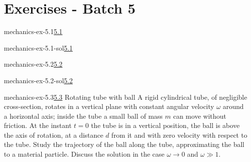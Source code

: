 \documentclass[preview]{standalone}
\begin{document}
\genpage

\section{Exercises - Batch 5}

\begin{snippetexercise}{mechanics-ex-5.1}{\underline{5.1}}
    \todo
\end{snippetexercise}

\begin{snippetsolution}{mechanics-ex-5.1-sol}{\underline{5.1}}
    \todo
\end{snippetsolution}

\begin{snippetexercise}{mechanics-ex-5.2}{\underline{5.2}}
    \todo
\end{snippetexercise}

\begin{snippetsolution}{mechanics-ex-5.2-sol}{\underline{5.2}}
    \todo
\end{snippetsolution}

\begin{snippetexercise}{mechanics-ex-5.3}{\underline{5.3} Rotating tube with ball}
    A rigid cylindrical tube, of negligible cross-section, rotates in a vertical plane with constant angular velocity
    \(\omega\) around a horizontal axis; inside the tube a small ball of mass \(m\) can move without friction.
    At the instant \(t=0\) the tube is in a vertical position, the ball is above the axis of rotation,
    at a distance \(d\) from it and with zero velocity with respect to the tube.
    Study the trajectory of the ball along the tube, approximating the ball to a material particle.
    Discuss the solution in the case
    \(\omega \to 0\) and \(\omega \gg 1\).
\end{snippetexercise}
\end{document}
